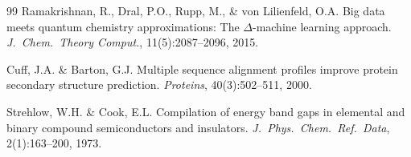 \documentclass[twocolumn,letterpaper,10pt]{article}
\begin{document}
\begin{thebibliography}{99}
Ramakrishnan, R., Dral, P.O., Rupp, M., \& von Lilienfeld, O.A.
\newblock Big data meets quantum chemistry approximations: The
  $\Delta$-machine learning approach.
\newblock \emph{J.\ Chem.\ Theory Comput.}, 11(5):2087--2096, 2015.

Cuff, J.A. \& Barton, G.J.
\newblock Multiple sequence alignment profiles improve
  protein secondary structure prediction.
\newblock \emph{Proteins}, 40(3):502--511, 2000.

Strehlow, W.H. \& Cook, E.L.
\newblock Compilation of energy band gaps in elemental and binary compound
  semiconductors and insulators.
\newblock \emph{J.\ Phys.\ Chem.\ Ref.\ Data}, 2(1):163--200, 1973.

\end{thebibliography}
\end{document}
